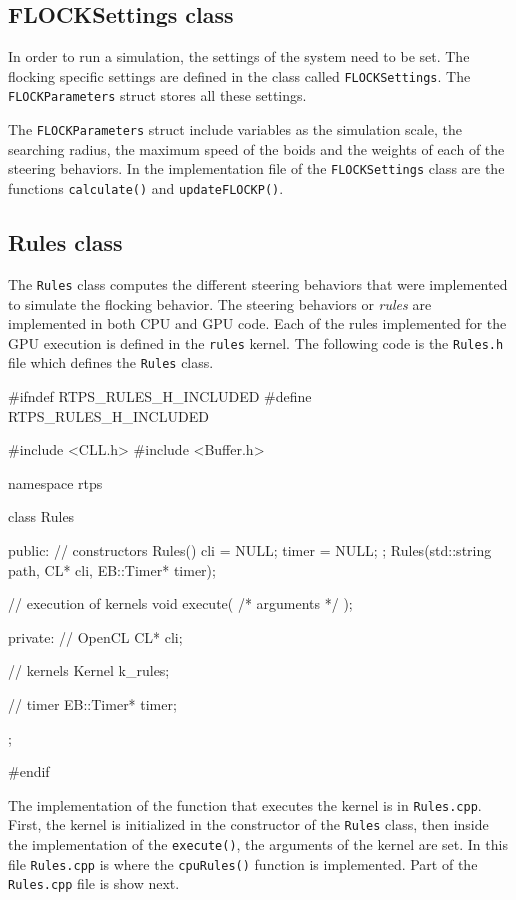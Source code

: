 \subsection{FLOCKSettings class}
In order to run a simulation, the settings of the system need to be set. The flocking specific settings are defined in the class called \texttt{FLOCKSettings}. The \texttt{FLOCKParameters} struct stores all these settings. 

The \texttt{FLOCKParameters} struct include variables as the simulation scale, the searching radius, the maximum speed of the boids and the weights of each of the steering behaviors. In the implementation file of the \texttt{FLOCKSettings} class are the functions \texttt{calculate()} and \texttt{updateFLOCKP()}.

\subsection{Rules class}\label{rulesclass}
The \texttt{Rules} class computes the different steering behaviors that were implemented to simulate the flocking behavior. The steering behaviors or \textit{rules} are implemented in both CPU and GPU code. Each of the rules implemented for the GPU execution is defined in the \texttt{rules} kernel. The following code is the \texttt{Rules.h} file which defines the \texttt{Rules} class.

\begin{cppcode}{0}
#ifndef RTPS_RULES_H_INCLUDED
#define RTPS_RULES_H_INCLUDED

#include <CLL.h>
 #include <Buffer.h>

namespace rtps
 {
	class Rules
	{
		public:
			// constructors
			Rules() { cli = NULL; timer = NULL; };
			Rules(std::string path, CL* cli, EB::Timer* timer);
			
			// execution of kernels
			void execute( /* arguments */ );
			
		private:
			// OpenCL
			CL* cli;
			
			// kernels
			Kernel k_rules;
			
			// timer
			EB::Timer* timer;
	};
}
#endif
\end{cppcode}

The implementation of the function that executes the kernel is in \texttt{Rules.cpp}. First, the kernel is initialized in the constructor of the \texttt{Rules} class, then inside the implementation of the \texttt{execute()}, the arguments of the kernel are set. In this file \texttt{Rules.cpp} is where the \texttt{cpuRules()} function is implemented. Part of the \texttt{Rules.cpp} file is show next.

